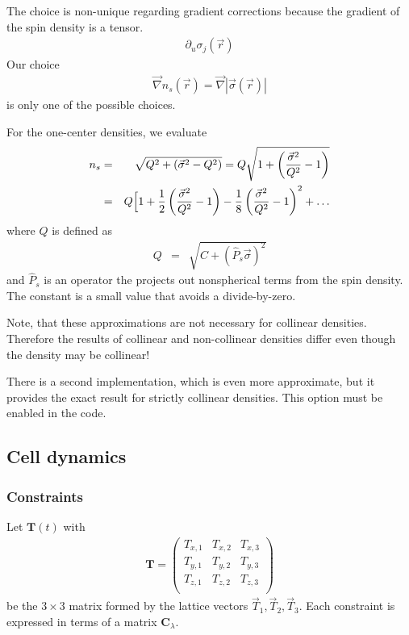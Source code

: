 \documentclass[final,12pt,makeidx,DIV=calc]{article}
\newcommand{\mat}[1]{\mathbf{#1}}
\begin{document}
{{{{{{The choice is non-unique regarding gradient corrections because the
gradient of the spin density is a tensor.
\begin{eqnarray*}
\partial_u\sigma_j(\vec{r})
\end{eqnarray*}
Our choice
\begin{eqnarray*}
\vec{\nabla}n_s(\vec{r})=\vec{\nabla}|\vec{\sigma}(\vec{r})|
\end{eqnarray*}
is only one of the possible choices. 


For the one-center densities, we evaluate
\begin{eqnarray*}
n_s&=&\sqrt{Q^2+\left(\vec{\sigma}^2-Q^2\right)}
=Q\sqrt{1+\left(\frac{\vec{\sigma}^2}{Q^2}-1\right)}
\\
&=&Q\Bigl[1+\frac{1}{2}\left(\frac{\vec{\sigma}^2}{Q^2}-1\right)
-\frac{1}{8}\left(\frac{\vec{\sigma}^2}{Q^2}-1\right)^2+\ldots
\end{eqnarray*}
where $Q$ is defined as
\begin{eqnarray*}
Q&=&\sqrt{C+(\hat{P}_s\vec{\sigma})^2}
\end{eqnarray*}
and $\hat{P}_s$ is an operator the projects out nonspherical terms
from the spin density. The constant is a small value that avoids a 
divide-by-zero.

Note, that these approximations are not necessary for collinear
densities. Therefore the results of collinear and non-collinear
densities differ even though the density may be collinear!

There is a second implementation, which is even more approximate, but
it provides the exact result for strictly collinear densities. This
option must be enabled in the code.

\subsection{Cell dynamics}
\subsubsection{Constraints}
\label{sec:unitcellconstraints}
Let $\mat{T}(t)$ with
\begin{eqnarray}
\mat{T}=\left(\begin{array}{ccc}
T_{x,1} & T_{x,2} & T_{x,3}\\
T_{y,1} & T_{y,2} & T_{y,3}\\
T_{z,1} & T_{z,2} & T_{z,3}\\
\end{array}\right)
\end{eqnarray}
be the $3\times3$ matrix formed by the lattice vectors
$\vec{T}_1,\vec{T}_2,\vec{T}_3$.  Each constraint is expressed in
terms of a matrix $\mat{C}_\lambda$. 


}}}}}}
\end{document}
